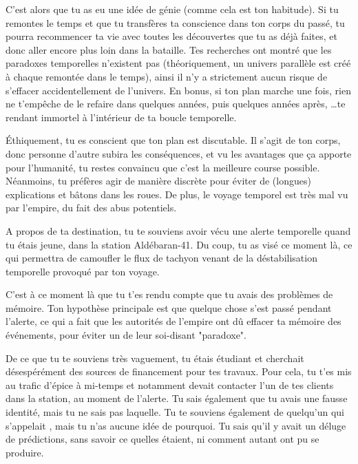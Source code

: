 {	\par C'est alors que tu as eu une idée de génie (comme cela est ton habitude). Si tu remontes le temps et que tu transfères ta conscience dans ton corps du passé, tu pourra recommencer ta vie avec toutes les découvertes que tu as déjà faites, et donc aller encore plus loin dans la bataille. Tes recherches ont montré que les paradoxes temporelles n'existent pas (théoriquement, un univers parallèle est créé à chaque remontée dans le temps), ainsi il n'y a strictement aucun risque de s'effacer accidentellement de l'univers. En bonus, si ton plan marche une fois, rien ne t'empêche de le refaire dans quelques années, puis quelques années après, \dots te rendant immortel à l'intérieur de ta boucle temporelle.
	
	\par Éthiquement, tu es conscient que ton plan est discutable. Il s'agit de ton corps, donc personne d'autre subira les conséquences, et vu les avantages que ça apporte pour l'humanité, tu restes convaincu que c'est la meilleure course possible. Néanmoins, tu préfères agir de manière discrète pour éviter de (longues) explications et bâtons dans les roues. De plus, le voyage temporel est très mal vu par l'empire, du fait des abus potentiels.
	
	\par A propos de ta destination, tu te souviens avoir vécu une alerte temporelle quand tu étais jeune, dans la station Aldébaran-41. Du coup, tu as visé ce moment là, ce qui permettra de camoufler le flux de tachyon venant de la déstabilisation temporelle provoqué par ton voyage.
	
	\par C'est à ce moment là que tu t'es rendu compte que tu avais des problèmes de mémoire. Ton hypothèse principale est que quelque chose s'est passé pendant l'alerte, ce qui a fait que les autorités de l'empire ont dû effacer ta mémoire des événements, pour éviter un de leur soi-disant "paradoxe".
	
	\par De ce que tu te souviens très vaguement, tu étais étudiant et cherchait désespérément des sources de financement pour tes travaux. Pour cela, tu t'es mis au trafic d'épice à mi-temps et notamment devait contacter l'un de tes clients dans la station, au moment de l'alerte. Tu sais également que tu avais une fausse identité, mais tu ne sais pas laquelle. Tu te souviens également de quelqu'un qui s'appelait \nmPlayerXI, mais tu n'as aucune idée de pourquoi. Tu sais qu'il y avait un déluge de prédictions, sans savoir ce quelles étaient, ni comment autant ont pu se produire.
	
}
